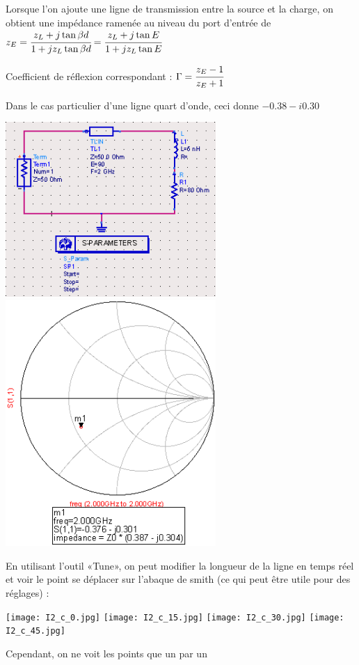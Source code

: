 \documentclass[10pt]{article}
\begin{document}
   Lorsque l’on ajoute une ligne de transmission entre la source et la charge, on obtient une impédance ramenée au niveau du port d’entrée de $z_E = \cfrac{z_L +j \tan{\beta d}}{1 + j z_L \tan{\beta d}}=\cfrac{z_L +j \tan{E}}{1 + j z_L \tan{E}}$

   Coefficient de réflexion correspondant : $\Gamma=\cfrac{z_E-1}{z_E+1}$

   Dans le cas particulier d’une ligne quart d’onde, ceci donne $-0.38-i0.30$

   \includegraphics[width=8cm]{I2_b_circuit.PNG}
   \includegraphics[width=8cm]{I2_b_smith.PNG}

   En utilisant l’outil «Tune», on peut modifier la longueur de la ligne en temps réel et voir le point se déplacer sur l’abaque de smith (ce qui peut être utile pour des réglages) :

   \texttt{[image: I2\_c\_0.jpg]}
   \texttt{[image: I2\_c\_15.jpg]}
   \texttt{[image: I2\_c\_30.jpg]}
   \texttt{[image: I2\_c\_45.jpg]}

   Cependant, on ne voit les points que un par un %
\end{document}

